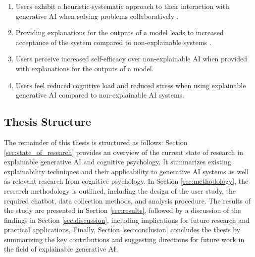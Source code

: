 \begin{enumerate}[label=(\textbf{H{\arabic*}})]
    \item Users exhibit a heuristic-systematic approach to their interaction with generative \ac{AI} when solving problems collaboratively \parencite{Jussupow2021}.
    \item Providing explanations for the outputs of a model leads to increased acceptance of the system compared to non-explainable systems \parencite{Li2022}.
    \item Users perceive increased self-efficacy over non-explainable \ac{AI} when provided with explanations for the outputs of a model.
    \item Users feel reduced cognitive load and reduced stress when using explainable generative \ac{AI} compared to non-explainable \ac{AI} systems.
\end{enumerate}


\subsection{Thesis Structure} \label{subsec:thesis-structure}

The remainder of this thesis is structured as follows: Section \ref{sec:state_of_research} provides an overview of the current state of research in explainable generative \ac{AI} and cognitive psychology. It summarizes existing explainability techniques and their applicability to generative \ac{AI} systems as well as relevant research from cognitive psychology. In Section \ref{sec:methodology}, the research methodology is outlined, including the design of the user study, the required chatbot, data collection methods, and analysis procedure. The results of the study are presented in Section \ref{sec:results}, followed by a discussion of the findings in Section \ref{sec:discussion}, including implications for future research and practical applications. Finally, Section \ref{sec:conclusion} concludes the thesis by summarizing the key contributions and suggesting directions for future work in the field of explainable generative \ac{AI}.
